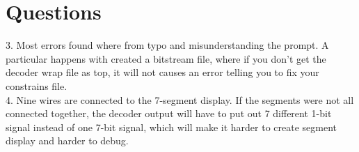 \documentclass[11pt]{article}
\begin{document}
\section*{Questions}
3. Most errors found where from typo and misunderstanding the prompt. A particular happens with created a bitstream file, where if you don't get the decoder wrap file as top, it will not causes an error telling you to fix your constrains file. \\
4. Nine wires are connected to the 7-segment display. If the segments were not all connected together, the decoder output will have to put out 7 different 1-bit signal instead of one 7-bit signal, which will make it harder to create segment display and harder to debug. 
\end{document}
